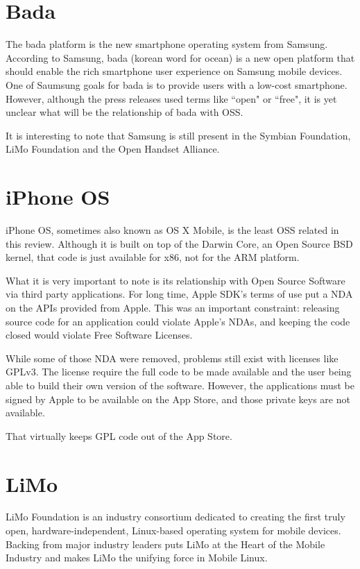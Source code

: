 \documentclass[12pt]{article}
\begin{document}
\section{Bada}
	The bada platform is the new smartphone operating system from Samsung. According to Samsung, bada (korean word for ocean) is a new open platform that should enable the rich smartphone user experience on Samsung mobile devices\cite{bada:goal}. One of Saumsung goals for bada is to provide users with a low-cost smartphone\cite{bada:press}. However, although the press releases used terms like ``open" or ``free", it is yet unclear what will be the relationship of bada with OSS. 

It is interesting to note that Samsung is still present in the Symbian Foundation, LiMo Foundation and the Open Handset Alliance.

\section{iPhone OS}

iPhone OS, sometimes also known as OS X Mobile, is the least OSS related in this review. Although it is built on top of the Darwin Core, an Open Source BSD kernel, that code is just available for x86, not for the ARM platform\cite{wiki:darwin}. 

What it is very important to note is its relationship with Open Source Software via third party applications. For long time, Apple SDK's terms of use put a NDA on the APIs provided from Apple. This was an important constraint: releasing source code for an application could violate Apple's NDAs, and keeping the code closed would violate Free Software Licenses\cite{iphoneOS:NDA,iphoneOS:LA}.

While some of those NDA were removed\cite{iphoneOS:NDAreleased}, problems still exist with licenses like GPLv3. The license require the full code to be made available and the user being able to build their own version of the software. However, the applications must be signed by Apple to be available on the App Store, and those private keys are not available\cite{wiki:iphoneOSLicensing, iphoneOS:GPLv3a, iphoneOS:GPLv3b}.

That virtually keeps GPL code out of the App Store. 

\section{LiMo}
	LiMo Foundation is an industry consortium dedicated to creating the first truly open, hardware-independent, Linux-based operating system for mobile devices. Backing from major industry leaders puts LiMo at the Heart of the Mobile Industry and makes LiMo the unifying force in Mobile Linux\cite{wiki:limo}.
\end{document}
